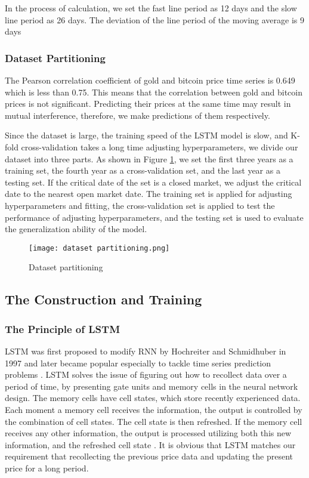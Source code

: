 \documentclass[12pt]{article}
\begin{document}
In the process of calculation, we set the fast line period as 12 days and the slow line period as 26 days. The deviation of the line period of the moving average is 9 days
\subsubsection{Dataset Partitioning}
The Pearson correlation coefficient of gold and bitcoin price time series is 0.649 which is less than 0.75. This means that the correlation between gold and bitcoin prices is not significant. Predicting their prices at the same time may result in mutual interference, therefore, we make predictions of them respectively.

Since the dataset is large, the training speed of the LSTM model is slow, and K-fold cross-validation takes a long time adjusting hyperparameters, we divide our dataset into three parts. As shown in Figure \ref{F2}, we set the first three years as a training set, the fourth year as a cross-validation set, and the last year as a testing set. If the critical date of the set is a closed market, we adjust the critical date to the nearest open market date. The training set is applied for adjusting hyperparameters and fitting, the cross-validation set is applied to test the performance of adjusting hyperparameters, and the testing set is used to evaluate the generalization ability of the model.
\begin{figure}[htb]
\centering
\texttt{[image: dataset partitioning.png]}
\caption{Dataset partitioning}
\label{F2} %
\end{figure}

\subsection{The Construction and Training}
\subsubsection{The Principle of LSTM}
LSTM was first proposed to modify RNN by Hochreiter and Schmidhuber in 1997 and later became popular especially to tackle time series prediction problems \cite{10}. LSTM solves the issue of figuring out how to recollect data over a period of time, by presenting gate units and memory cells in the neural network design. The memory cells have cell states, which store recently experienced data. Each moment a memory cell receives the information, the output is controlled by the combination of cell states. The cell state is then refreshed. If the memory cell receives any other information, the output is processed utilizing both this new information, and the refreshed cell state \cite{11}. It is obvious that LSTM matches our requirement that recollecting the previous price data and updating the present price for a long period.
\end{document}
